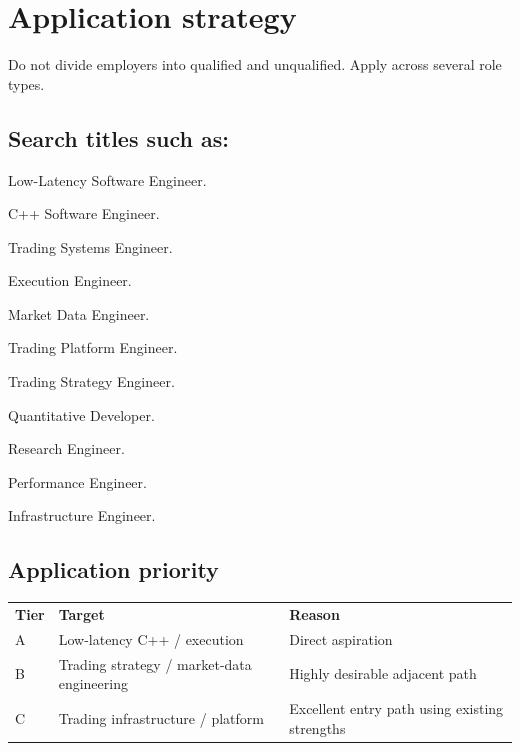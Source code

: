 \documentclass[11pt,letterpaper]{article}
\begin{document}
\section{Application strategy}\label{sec:16}

Do not divide employers into qualified and unqualified. Apply across several role types.

\subsection*{Search titles such as:}

\begin{topics}

\item Low-Latency Software Engineer.

\item C++ Software Engineer.

\item Trading Systems Engineer.

\item Execution Engineer.

\item Market Data Engineer.

\item Trading Platform Engineer.

\item Trading Strategy Engineer.

\item Quantitative Developer.

\item Research Engineer.

\item Performance Engineer.

\item Infrastructure Engineer.

\end{topics}

\subsection*{Application priority}

\begin{center}
\small
\begin{tabular}{>{\raggedright\arraybackslash}p{}>{\raggedright\arraybackslash}p{}>{\raggedright\arraybackslash}p{}}
\textbf{Tier} & \textbf{Target} & \textbf{Reason} \\
A & Low-latency C++ / execution & Direct aspiration \\
B & Trading strategy / market-data engineering & Highly desirable adjacent path \\
C & Trading infrastructure / platform & Excellent entry path using existing strengths \\
\end{tabular}
\end{center}
\end{document}
